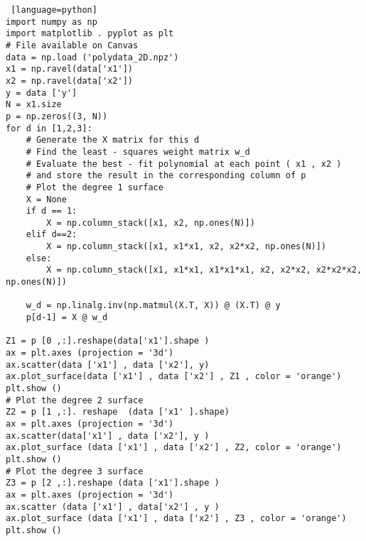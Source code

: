 \documentclass[a4paper, 12pt]{article}
\begin{document}
\begin{problem} [Problem 5]
\end{problem}
\begin{solution}
\mbox{}

\begin{lstlisting} [language=python]
import numpy as np
import matplotlib . pyplot as plt
# File available on Canvas
data = np.load ('polydata_2D.npz')
x1 = np.ravel(data['x1'])
x2 = np.ravel(data['x2'])
y = data ['y']
N = x1.size
p = np.zeros((3, N))
for d in [1,2,3]:
    # Generate the X matrix for this d
    # Find the least - squares weight matrix w_d
    # Evaluate the best - fit polynomial at each point ( x1 , x2 )
    # and store the result in the corresponding column of p
    # Plot the degree 1 surface
    X = None
    if d == 1:
        X = np.column_stack([x1, x2, np.ones(N)])
    elif d==2:
        X = np.column_stack([x1, x1*x1, x2, x2*x2, np.ones(N)])
    else:
        X = np.column_stack([x1, x1*x1, x1*x1*x1, x2, x2*x2, x2*x2*x2, np.ones(N)])

    w_d = np.linalg.inv(np.matmul(X.T, X)) @ (X.T) @ y
    p[d-1] = X @ w_d
    
Z1 = p [0 ,:].reshape(data['x1'].shape )
ax = plt.axes (projection = '3d')
ax.scatter(data ['x1'] , data ['x2'], y)
ax.plot_surface(data ['x1'] , data ['x2'] , Z1 , color = 'orange')
plt.show ()
# Plot the degree 2 surface
Z2 = p [1 ,:]. reshape  (data ['x1' ].shape)
ax = plt.axes (projection = '3d')
ax.scatter(data['x1'] , data ['x2'], y )
ax.plot_surface (data ['x1'] , data ['x2'] , Z2, color = 'orange')
plt.show ()
# Plot the degree 3 surface
Z3 = p [2 ,:].reshape (data ['x1'].shape )
ax = plt.axes (projection = '3d')
ax.scatter (data ['x1'] , data['x2'] , y )
ax.plot_surface (data ['x1'] , data ['x2'] , Z3 , color = 'orange')
plt.show ()
\end{lstlisting}
\end{solution}
\end{document}
